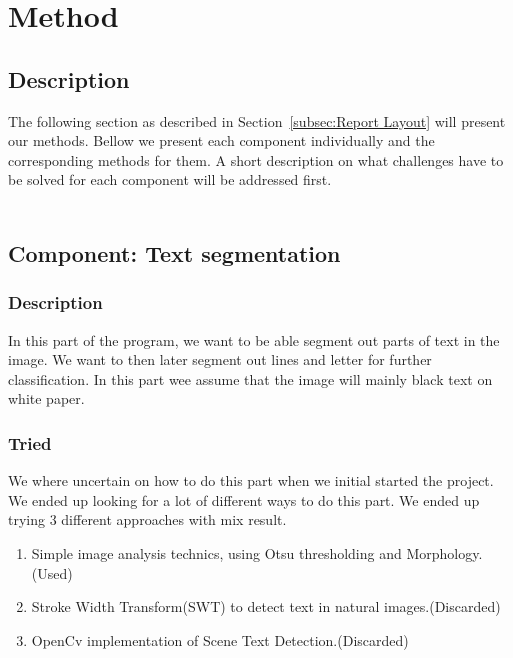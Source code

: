 \documentclass[Report.tex]{subfiles}
\begin{document}
\chapter{Method}
\label{sec:Method}
\section{Description}
The following section as described in Section~\ref{subsec:Report Layout} will
present our methods. Bellow we present each component individually and the
corresponding methods for them. A short description on what challenges have to
be solved for each component will be addressed first. \\ \\


\section{Component: Text segmentation}
\label{Method:Text_segmentation}

\subsection{Description}
In this part of the program, we want to be able segment out parts of text in the image. We want to then later segment out lines and letter for further classification. In this part wee assume that the image will mainly black text on white paper.

\subsection{Tried}
We where uncertain on how to do this part when we initial started the project. We ended up looking for a lot of different ways to do this part. We ended up trying 3 different approaches with mix result.
\begin{enumerate}
  \item Simple image analysis technics, using Otsu thresholding and Morphology.(Used)
  \item Stroke Width Transform(SWT) to detect text in natural images.(Discarded)
  \item OpenCv implementation of Scene Text Detection.(Discarded)
\end{enumerate}
\end{document}
